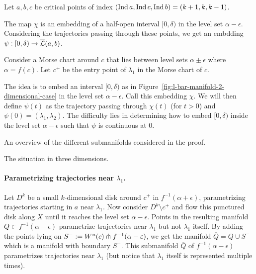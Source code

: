 \begin{myproof}
    Let $a,b,c$ be critical points of index $(\operatorname{Ind} a, \operatorname{Ind} c, \operatorname{Ind} b) = (k+1,k,k-1)$.
    \begin{marginfigure}
        \centering
        \caption{The map $\chi$ is an embedding of a half-open interval $[0, \delta)$ in the level set $\alpha- \epsilon$. Considering the trajectories passing through these points, we get an embdding $\psi: [0, \delta) \to \overline{\mathcal L}(a, b)$.}
        \label{fig:l-bar-manifold-2-dimensional-case}
    \end{marginfigure}
    Consider a Morse chart around $c$ that lies between level sets $\alpha \pm \epsilon$ where  $\alpha = f(c)$.
    Let $c^{+}$ be the entry point of $\lambda_1$ in  the Morse chart of $c$.

    The idea is to embed an interval $[0, \delta)$ as in Figure~\ref{fig:l-bar-manifold-2-dimensional-case} in the level set $\alpha - \epsilon$. Call this embedding $\chi$.
    We will then define $\psi(t)$ as the trajectory passing through $\chi(t)$ (for $t>0$) and  $\psi(0) = (\lambda_1, \lambda_2)$.
    The difficulty lies in determining how to embed $[0, \delta)$ inside the level set $\alpha - \epsilon$ such that $\psi$ is continuous at  $0$.
    \begin{marginfigure}
        \centering
        \caption{An overview of the different submanifolds considered in the proof.}
        \label{fig:l-bar-manifold-2-dimensional-case-part-flow}
    \end{marginfigure}
\begin{marginfigure}
    \centering
    \caption{The situation in three dimensions.}
    \label{fig:lbar-manifold-three-dimensional-case}
\end{marginfigure}

\paragraph{Parametrizing trajectories near $\lambda_1$.}
Let $D^{k}$ be a small $k$-dimensional disk around $c^{+}$ in $f^{-1}(\alpha+\epsilon)$, parametrizing trajectories starting in $a$ near $\lambda_1$.
    Now consider $D^{k} \setminus c^{+}$ and flow this punctured disk along $X$ until it reaches the level set  $\alpha - \epsilon$.
    Points in the resulting manifold $Q \subset f^{-1}(\alpha - \epsilon)$ parametrize trajectories near $\lambda_1$ but not $\lambda_1$ itself.
    By adding the points lying on $S^{-} := W^u(c) \pitchfork f^{-1}(\alpha - \varepsilon)$, we get the manifold $\overline{Q} = Q \cup S^{-}$ which is a manifold with boundary $S^{-}$.
    This submanifold $\overline{Q}$ of $f^{-1}(\alpha-\epsilon)$ parametrizes trajectories near $\lambda_1$ (but notice that $\lambda_1$ itself is represented multiple times).



\end{myproof}
